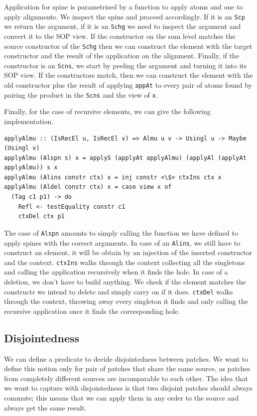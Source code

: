\documentclass[11pt, titlepage]{article}
\newcommand{\toHaskell}[1]{\texttt{#1}\xspace}
\newcommand{\alins}{\toHaskell{Alins}}
\newcommand{\alspn}{\toHaskell{Alspn}}
\newcommand{\scp}{\toHaskell{Scp}}
\newcommand{\scns}{\toHaskell{Scns}}
\newcommand{\schg}{\toHaskell{Schg}}
\begin{document}
Application for spine is parametrised by a function to apply atoms and one to 
apply alignments. We inspect the spine and proceed accordingly. If it is an \scp 
we return the argument, if it is an \schg we need to inspect the argument and 
convert it to the SOP view. If the constructor on the sum level matches the 
source constructor of the \schg then we can construct the element with the 
target constructor and the result of the application on the alignment.
Finally, if the constructor is an \scns, we start by peeling the argument and 
turning it into its SOP view. If the constructors match, then we can construct 
the element with the old constructor plus the result of applying \texttt{appAt} 
to every pair of atoms found by pairing the product in the \scns and the view of 
\texttt{x}.

Finally, for the case of recursive elements, we can give the following 
implementation.

\begin{verbatim}
applyAlmu :: (IsRecEl u, IsRecEl v) => Almu u v -> Usingl u -> Maybe (Usingl v)
applyAlmu (Alspn s) x = applyS (applyAt applyAlmu) (applyAl (applyAt applyAlmu)) s x
applyAlmu (Alins constr ctx) x = inj constr <\$> ctxIns ctx x
applyAlmu (Aldel constr ctx) x = case view x of
  (Tag c1 p1) -> do
    Refl <- testEquality constr c1
    ctxDel ctx p1
\end{verbatim}
 
 The case of \alspn amounts to simply calling the function we have defined to 
 apply spines with the correct arguments.
In case of an \alins, we still have to construct an element, it will be obtain 
by an injection of the inserted constructor and the context. 
\texttt{ctxIns} walks through the context collecting all the singletons and 
calling the application recursively when it finds the hole.
In case of a deletion, we don't have to build anything. We check if the element 
matches the constructr we intend to delete and simply carry on if it does.
\texttt{ctxDel} walks through the context, throwing away every singleton it 
finds and only calling the recursive application once it finds the corresponding 
hole.

\subsection{Disjointedness}\label{disj}
We can define a predicate to decide disjointedness between patches. We want to define this notion only for pair of patches that share the same source, as patches from completely different sources are incomparable to each other. 
The idea that we want to capture with disjointedness is that two disjoint patches should always commute; this means that we can apply them in any order to the source and always get the same result.
\end{document}
